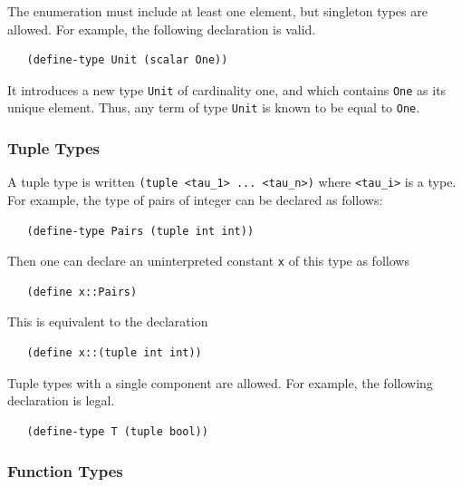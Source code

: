 \documentclass[11pt,twoside,fleqn,openright,titlepage]{cslreport}
\begin{document}
\medskip\noindent The enumeration must include at least one element,
but  singleton   types  are   allowed.  For  example,   the  following
declaration is valid.
\begin{small}
\begin{verbatim}
   (define-type Unit (scalar One))
\end{verbatim}
\end{small}
It introduces a  new type \texttt{Unit} of cardinality  one, and which
contains \texttt{One}  as its unique  element. Thus, any term  of type
\texttt{Unit} is known to be equal to \texttt{One}.


\subsubsection*{Tuple Types}

A tuple  type is written \texttt{(tuple <tau\_1>  ... <tau\_n>)} where
\texttt{<tau\_i>} is a type. For example, the type of pairs of integer
can be declared as follows:
\begin{small}
\begin{verbatim}
   (define-type Pairs (tuple int int))
\end{verbatim}
\end{small}
Then one can declare an uninterpreted constant \texttt{x} of this type
as follows
\begin{small}
\begin{verbatim}
   (define x::Pairs)
\end{verbatim}
\end{small}
This is equivalent to the declaration
\begin{small}
\begin{verbatim}
   (define x::(tuple int int))
\end{verbatim}
\end{small}

\medskip\noindent   Tuple  types   with  a   single   component  are
allowed. For example, the following declaration is legal.
\begin{small}
\begin{verbatim}
   (define-type T (tuple bool))
\end{verbatim}
\end{small}

\subsubsection*{Function Types}
\end{document}
